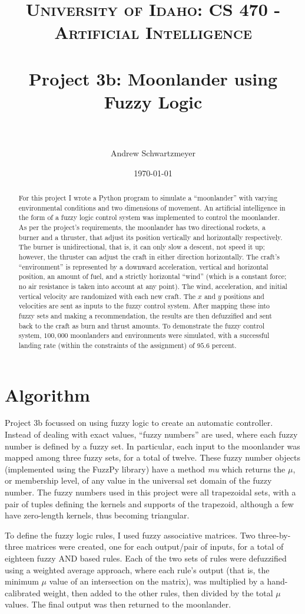 \documentclass[12pt, article]{scrartcl}
\title{	
\normalfont \normalsize 
\textsc{University of Idaho: CS 470 - Artificial Intelligence} \\ [25pt]
\horrule{0.5pt} \\[0.4cm]
\huge Project 3b: Moonlander using Fuzzy Logic\\
\horrule{2pt} \\[0.5cm]
}
\author{Andrew Schwartzmeyer}
\date{\normalsize\today}
\begin{document}
\maketitle 
\begin{abstract}
For this project I wrote a Python program to simulate a ``moonlander'' with varying environmental conditions and two dimensions of movement. An artificial intelligence in the form of a fuzzy logic control system was implemented to control the moonlander. As per the project's requirements, the moonlander has two directional rockets, a burner and a thruster, that adjust its position vertically and horizontally respectively. The burner is unidirectional, that is, it can only slow a descent, not speed it up; however, the thruster can adjust the craft in either direction horizontally. The craft's ``environment'' is represented by a downward acceleration, vertical and horizontal position, an amount of fuel, and a strictly horizontal ``wind'' (which is a constant force; no air resistance is taken into account at any point). The wind, acceleration, and initial vertical velocity are randomized with each new craft. The $x$ and $y$ positions and velocities are sent as inputs to the fuzzy control system. After mapping these into fuzzy sets and making a recommendation, the results are then defuzzified and sent back to the craft as burn and thrust amounts. To demonstrate the fuzzy control system, $100,000$ moonlanders and environments were simulated, with a successful landing rate (within the constraints of the assignment) of $95.6$ percent.
\end{abstract}
\pagebreak
\section{Algorithm}
Project 3b focussed on using fuzzy logic to create an automatic controller. Instead of dealing with exact values, ``fuzzy numbers'' are used, where each fuzzy number is defined by a fuzzy set. In particular, each input to the moonlander was mapped among three fuzzy sets, for a total of twelve. These fuzzy number objects (implemented using the FuzzPy library) have a method \emph{mu} which returns the $\mu$, or membership level, of any value in the universal set domain of the fuzzy number. The fuzzy numbers used in this project were all trapezoidal sets, with a pair of tuples defining the kernels and supports of the trapezoid, although a few have zero-length kernels, thus becoming triangular.

To define the fuzzy logic rules, I used fuzzy associative matrices. Two three-by-three matrices were created, one for each output/pair of inputs, for a total of eighteen fuzzy AND based rules. Each of the two sets of rules were defuzzified using a weighted average approach, where each rule's output (that is, the minimum $\mu$ value of an intersection on the matrix), was multiplied by a hand-calibrated weight, then added to the other rules, then divided by the total $\mu$ values. The final output was then returned to the moonlander.
\end{document}
